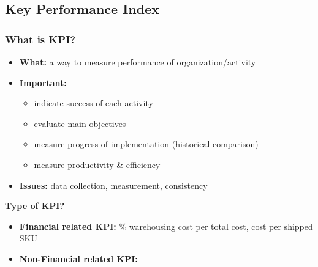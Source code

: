 \documentclass[10pt,handout,notes=show]{beamer}
\begin{document}
\begin{frame}
  \end{frame}


\subsection[KPI]{Key Performance Index}
\begin{frame}
  \frametitle{What is KPI?}

  \begin{itemize}
    \item \textbf{What:} a way to measure performance of organization/activity
    \item \textbf{Important:}
    \begin{itemize}
      \item indicate success of each activity
      \item evaluate main objectives
      \item measure progress of implementation (historical comparison)
      \item measure productivity \& efficiency  \NextHalfLine
    \end{itemize}
    \item \textbf{Issues:} data collection, measurement, \alert{consistency}
  \end{itemize}

  \NextLine
  \textbf{Type of KPI?}
  \begin{itemize}
    \item \textbf{Financial related KPI:} \% warehousing cost per total cost, cost per shipped SKU
    \item \textbf{Non-Financial related KPI:}
   \end{itemize}

  \end{frame}
\end{document}
